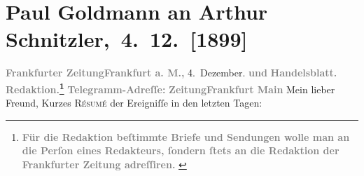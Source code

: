 

         
         \renewcommand{\erwaehntePersonen}{Personen: Berthold Frischauer, Theodore Rottenberg}
         \renewcommand{\erwaehnteInstitutionen}{Institutionen: Frankfurter Zeitung, Neue Freie Presse}
         \renewcommand{\erwaehnteOrte}{Orte: Berlin, Frankfurt am Main, Gärtnerweg, Paris, Wien}
         \renewcommand{\erwaehnteWerke}{}
               \section[ Paul Goldmann an Arthur Schnitzler, 4. 12. {[}1899{]}]{ Paul Goldmann an Arthur Schnitzler, 4. 12. {[}1899{]}}\nopagebreak{}\rehead{ }\begin{ledgroupsized}[t]{13cm}\normalsize\beginnumbering \toendnotes[C]{\smallbreak\pagebreak[2]} 
\toendnotes[C]{\smallbreak}\pstart
           \noindent{}{\pb}\textcolor{gray}{\textbf{\textbf{Frankfurter Zeitung}}}\hfill \textcolor{gray}{\textbf{\textbf{Frankfurt a.
                        M.,}}}{ }4. Dezember.\pend
           \pstart
           \textcolor{gray}{\textbf{und}}\pend
           \pstart
           \textcolor{gray}{\textbf{Handelsblatt.}}\pend
           \pstart
           \textcolor{gray}{\textbf{\textbf{Redaktion.}\footnote{\noindent{}\textcolor{gray}{\textbf{Für die Redaktion beſtimmte Briefe und Sendungen wolle man
                                  an die Perſon eines Redakteurs,
                              ſondern ſtets \textbf{an die Redaktion der Frankfurter Zeitung} adreſſiren. }}}}}\pend
           \pstart
           \textcolor{gray}{\textbf{Telegramm-Adreſſe:}}\pend
           \pstart
           \textcolor{gray}{\textbf{\textbf{ZeitungFrankfurt Main}}}\pend
           \pstart{}Mein lieber Freund,\pend\pstart
           Kurzes \textsc{Résumé} der Ereigniſſe in den letzten Tagen:\pend

\end{ledgroupsized}
